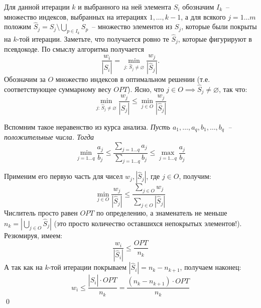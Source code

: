 Для данной итерации $k$ и выбранного на ней элемента $S_i$ обозначим $I_k$~-- множество индексов, выбранных на итерациях $1, \ldots, k-1$, а для всякого $j=1\ldots m$ положим $\hat{S}_j = S_j \setminus \bigcup_{p \in I_k}S_p$~-- множество элементов из $S_j$, которые были покрыты на $k$-той итерации. Заметьте, что получается ровно те $\hat{S}_j$, которые фигурируют в псевдокоде. По смыслу алгоритма получается $$\frac{w_i}{|\hat{S}_i|} = \min_{j:\, \hat{S}_j\neq\varnothing} \frac{w_j}{|\hat{S}_j|}.$$
Обозначим за $O$ множество индексов в оптимальном решении (т.е. соответствующее суммарному весу $OPT$). Ясно, что $j \in O \implies \hat{S}_j \neq\varnothing$, так что: $$\min_{j:\, \hat{S}_j\neq\varnothing} \frac{w_j}{|\hat{S}_j|} \leq \min_{j \in O} \frac{w_j}{|\hat{S}_j|}$$

Вспомним такое неравенство из курса анализа. \textit{Пусть $a_1, \ldots, a_q, b_1, \ldots, b_q$~-- положительные числа. Тогда}
$$\min_{j=1\ldots q} \frac{a_j}{b_j} \leq \frac{\sum\limits_{j=1\ldots q} a_j}{\sum\limits_{j=1\ldots q} b_j} \leq \max_{j=1\ldots q} \frac{a_j}{b_j}$$

Применим его первую часть для чисел $w_j, |\hat{S}_j|$, где $j \in O$, получим:
$$\min_{j\in O} \frac{w_j}{\left|\hat{S}_j\right|} \leq \frac{\sum\limits_{j \in O} w_j}{\sum\limits_{j \in O} |\hat{S}_j|}$$
Числитель просто равен $OPT$ по определению, а знаменатель не меньше $n_k = |\bigcup_{j \in O} \hat{S}_j|$ (это просто количество оставшихся непокрытых элементов!). Резюмируя, имеем: $$\frac{w_i}{|\hat{S}_i|} \leq \frac{OPT}{n_k}$$
А так как на $k$-той итерации покрываем $|\hat{S}_i| = n_k - n_{k+1}$, получаем наконец:
$$w_i \leq \frac{|\hat{S}_i|\cdot OPT}{n_k} = \frac{(n_k-n_{k+1})\cdot OPT}{n_k}$$\qed
